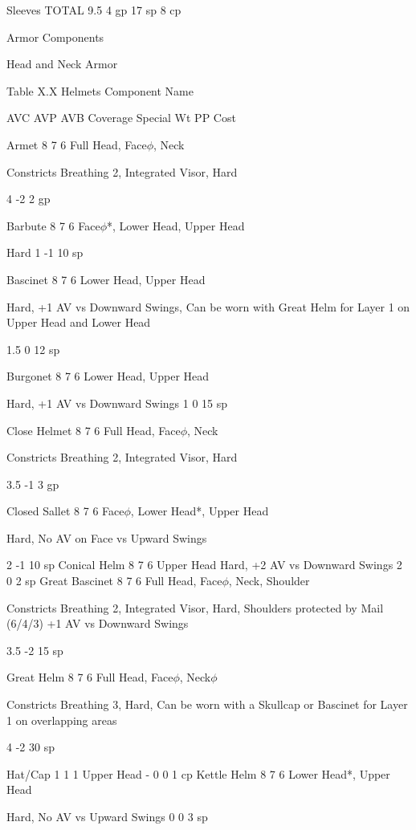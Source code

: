 \documentclass[oneside,11pt,english]{book}
\begin{document}
Sleeves 
TOTAL 9.5 4 gp 
17 
sp 
8 cp 

 

Armor Components 

 

Head and Neck Armor 

 

Table X.X Helmets 
Component 
Name 

AVC AVP AVB Coverage Special Wt PP Cost 

Armet 8 7 6 Full Head, Face$\phi$, 
Neck 

Constricts Breathing 2, 
Integrated Visor, Hard 

4 -2 2 gp 

Barbute 8 7 6 Face$\phi$*, Lower Head, 
Upper Head 

Hard 1 -1 10 
sp 

Bascinet 8 7 6 Lower Head, Upper 
Head 

Hard, +1 AV vs Downward Swings, 
Can be worn with Great Helm for 
Layer 1 on Upper Head and Lower 
Head 

1.5 0 12 
sp 

Burgonet 8 7 6 Lower Head, Upper 
Head 

Hard, +1 AV vs Downward Swings 1 0 15 
sp 

Close Helmet 8 7 6 Full Head, Face$\phi$, 
Neck 

Constricts Breathing 2, 
Integrated Visor, Hard 

3.5 -1 3 gp 

Closed Sallet 8 7 6 Face$\phi$, Lower Head*, 
Upper Head 

Hard, No AV on Face vs Upward 
Swings 

2 -1 10 
sp 
Conical Helm 8 7 6 Upper Head Hard, +2 AV vs Downward Swings 2 0 2 sp 
Great Bascinet 8 7 6 Full Head, Face$\phi$, 
Neck, Shoulder 

Constricts Breathing 2, Integrated 
Visor, Hard, Shoulders protected by 
Mail (6/4/3) +1 AV vs Downward 
Swings 

3.5 -2 15 
sp 

Great Helm 8 7 6 Full Head, Face$\phi$, 
Neck$\phi$ 

Constricts Breathing 3, Hard, Can be 
worn with a Skullcap or Bascinet for 
Layer 1 on overlapping areas 

4 -2 30 
sp 

Hat/Cap 1 1 1 Upper Head - 0 0 1 cp 
Kettle Helm 8 7 6 Lower Head*, Upper 
Head 

Hard, No AV vs Upward Swings 0 0 3 sp 
\end{document}
